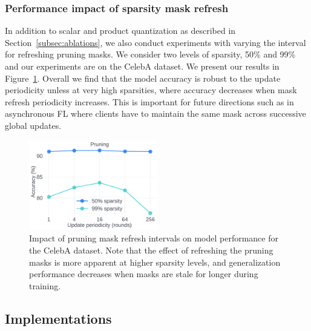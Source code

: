 \subsubsection{Performance impact of sparsity mask refresh}
\label{sparse_refresh}

In addition to scalar and product quantization as described in Section~\ref{subsec:ablations}, we also conduct experiments with varying the interval for refreshing pruning masks. We consider two levels of sparsity, 50\% and 99\% and our experiments are on the CelebA dataset. We present our results in Figure~\ref{fig:pruning}. Overall we find that the model accuracy is robust to the update periodicity unless at very high sparsities, where accuracy decreases when mask refresh periodicity increases. This is important for future directions such as in asynchronous FL where clients have to maintain the same mask across successive global updates.
\begin{figure}[t]
\label{fig-refresh}
    \centering
    \includegraphics[width=0.5\textwidth]{submissions/GrahamCormode/figs/pruning}
    \caption{\label{fig:pruning}
    Impact of pruning mask refresh intervals on model performance for the CelebA dataset. Note that the effect of refreshing the pruning masks is more apparent at higher sparsity levels, and generalization performance decreases when masks are stale for longer during training. }
\end{figure}


\subsection{\SecInd Implementations}
\label{appendix:secind}


